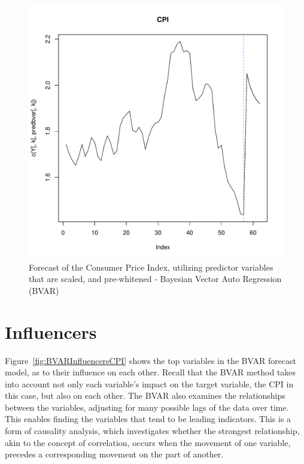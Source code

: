 \documentclass[12pt]{article}         %
\begin{document}
\begin{figure}[!ht]
\begin{center}
\includegraphics[width=\linewidth]{plots/CPI_forecast.pdf}
\caption{Forecast of the Consumer Price Index, utilizing predictor variables that are scaled, and pre-whitened - Bayesian Vector Auto Regression (BVAR)}
\label{fig:BVARForecastCPI}
\end{center}
\end{figure}

\section{Influencers}

Figure~\ref{fig:BVARInfluencersCPI} shows the top variables in the BVAR forecast model, as to their influence on each other.  Recall that the BVAR method takes into account not only each variable's impact on the target variable, the CPI in this case, but also on each other.  The BVAR also examines the relationships between the variables, adjusting for many possible lags of the data over time.  This enables finding the variables that tend to be leading indicators.  This is a form of causality analysis, which investigates whether the strongest relationship, akin to the concept of correlation, occurs when the movement of one variable, precedes a corresponding movement on the part of another.
\end{document}
